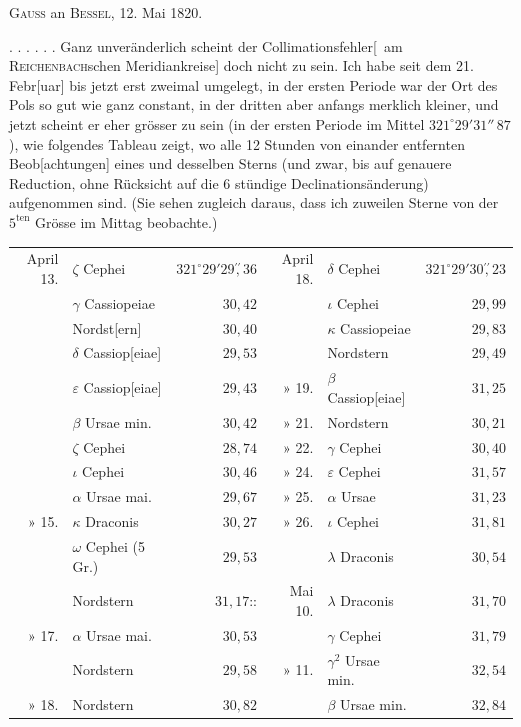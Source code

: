 \begin{center}\textsc{Gauss} an \textsc{Bessel}, 12. Mai 1820.\end{center}
\noindent\hspace*{\parindent}. . . . . . Ganz unveränderlich scheint der Collimationsfehler[\begingroup\renewcommand{\thefootnote}{**)}\footnotemark\renewcommand{\thefootnote}{[**)}\footnotetext{Indexfehler des Kreises.]}\endgroup\ am \textsc{Reichenbach}schen Meridiankreise] doch nicht zu sein. Ich habe seit dem 21. Febr[uar] bis jetzt erst zweimal umgelegt, in der ersten Periode war der Ort des Pols so gut wie ganz constant, in der dritten aber anfangs merklich kleiner, und jetzt scheint er eher grösser zu sein (in der ersten Periode im Mittel \(321^\circ29'31''\,87\)), wie folgendes Tableau zeigt, wo alle 12 Stunden von einander entfernten Beob[achtungen] eines und desselben Sterns (und zwar, bis auf genauere Reduction, ohne Rücksicht auf die 6 stündige Declinationsänderung) aufgenommen sind. (Sie sehen zugleich daraus, dass ich zuweilen Sterne von der \(5^{\mathrm{ten}}\) Grösse im Mittag beobachte.)
\clearpage{}
\begin{center}\begingroup\fontsize{9}{11}\selectfont\setlength{\tabcolsep}{2.3pt}
\begin{tabular}{@{}rlr|rlr@{}}
April 13.&\(\zeta\) Cephei&\(321^\circ29'29\overset{\prime\prime}{,}36\)&April 18.&\(\delta\) Cephei&\(321^\circ29'30\overset{\prime\prime}{,}23\)\\
&\(\gamma\) Cassiopeiae&\(30{,}42\)&&\(\iota\) Cephei&\(29{,}99\)\\
&Nordst[ern]&\(30{,}40\)&&\(\kappa\) Cassiopeiae&\(29{,}83\)\\
&\(\delta\) Cassiop[eiae]&\(29{,}53\)&&Nordstern&\(29{,}49\)\\
&\(\varepsilon\) Cassiop[eiae]&\(29{,}43\)&» 19.&\(\beta\) Cassiop[eiae]&\(31{,}25\)\\
&\(\beta\) Ursae min.&\(30{,}42\)&» 21.&Nordstern&\(30{,}21\)\\
&\(\zeta\) Cephei&\(28{,}74\)&» 22.&\(\gamma\) Cephei&\(30{,}40\)\\
&\(\iota\) Cephei&\(30{,}46\)&» 24.&\(\varepsilon\) Cephei&\(31{,}57\)\\
&\(\alpha\) Ursae mai.&\(29{,}67\)&» 25.&\(\alpha\) Ursae&\(31{,}23\)\\
» 15.&\(\kappa\) Draconis&\(30{,}27\)&» 26.&\(\iota\) Cephei&\(31{,}81\)\\
&\(\omega\) Cephei (5 Gr.)&\(29{,}53\)&&\(\lambda\) Draconis&\(30{,}54\)\\
&Nordstern&\(31{,}17\)::&Mai 10.&\(\lambda\) Draconis\begingroup\renewcommand{\thefootnote}{*)}\raisebox{.65ex}{\footnotemark}\endgroup&\(31{,}70\)\\
» 17.&\(\alpha\) Ursae mai.&\(30{,}53\)&&\(\gamma\) Cephei&\(31{,}79\)\\
&Nordstern&\(29{,}58\)&» 11.&\(\gamma^2\) Ursae min.&\(32{,}54\)\\
» 18.&Nordstern&\(30{,}82\)&&\(\beta\) Ursae min.&\(32{,}84\)
\end{tabular}\par\endgroup\end{center}
